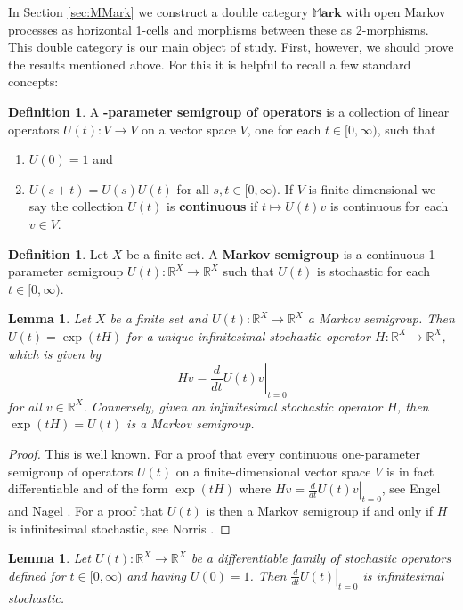 \documentclass[oneside,final]{ucr}
\newtheorem{lemma}[theorem]{Lemma}
\theoremstyle{definition}
\newtheorem{definition}[theorem]{Definition}
\newcommand{\maps}{\colon}
\newcommand{\R}{\mathbb{R}}
\newcommand{\define}[1]{{\bf \boldmath #1}}
\newcommand{\MMark}{\mathbb{M}\mathbf{ark}}
\begin{document}
{In Section \ref{sec:MMark} we construct a double category $\MMark$ with open Markov processes as horizontal 1-cells and morphisms between these as 2-morphisms.  This double category is our main object of study.   First, however, we should prove the results mentioned above.   For this it is helpful to recall a few standard concepts:

\begin{definition}
A \define{1-parameter semigroup of operators} is a collection of linear operators $U(t) \maps V \to V$ on a vector space $V$, one for each $t \in [0,\infty)$, such that
\begin{enumerate}
\item $U(0)=1$ and 
\item $U(s+t)=U(s)U(t)$ for all $s,t \in [0,\infty)$.
If $V$ is finite-dimensional we say the collection $U(t)$ is \define{continuous} if $t \mapsto U(t) v$ is continuous for each $v \in V$.
\end{enumerate}
\end{definition}

\begin{definition}
Let $X$ be a finite set. A \define{Markov semigroup} is a continuous 1-parameter semigroup
$U(t) \maps \R^X \to \R^X$ such that $U(t)$ is stochastic for each $t \in [0,\infty)$.
\end{definition}

\begin{lemma}
\label{lem:exponentiation}
Let $X$ be a finite set and $U(t) \maps \R^X \to \R^X$ a Markov semigroup. Then $U(t)= \exp(tH)$ for a unique infinitesimal stochastic operator $H \maps \R^X \to \R^X$, which is given by
\[  Hv = \left. \frac{d}{dt} U(t)v \right|_{t=0} \]
for all $v \in \R^X$. Conversely, given an infinitesimal stochastic operator $H$, then $\exp(tH)=U(t)$ is a Markov semigroup. 
\end{lemma}

\begin{proof}  This is well known.   For a proof that every continuous one-parameter semigroup of 
operators $U(t)$ on a finite-dimensional vector space $V$ is in fact differentiable and of the form $\exp(tH)$ where $Hv = \left. \frac{d}{dt} U(t)v \right|_{t=0}$, see Engel and Nagel \cite[Sec.\ I.2]{EngelNagel}.  For a proof that $U(t)$ is then a Markov semigroup if and only if $H$ is infinitesimal stochastic, see Norris \cite[Theorem\ 2.1.2]{Norris}. \end{proof}

\begin{lemma}
\label{lem:differentiation}
Let $U(t) \maps \R^X \to \R^X$ be a differentiable family of stochastic operators defined for $t \in [0,\infty)$ and having $U(0)=1$. Then $\left. \frac{d}{dt} U(t) \right|_{t=0}$ is infinitesimal stochastic.
\end{lemma}

}
\end{document}
